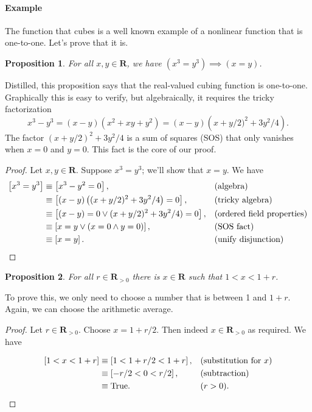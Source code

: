 \documentclass[12pt,fleqn]{article}
\newcommand{\reals}{\mathbf{R}}
\newcommand{\true}{\mathrm{True}}
\newenvironment{myproof}
  {\begin{shaded}\begin{proof}}
  {\end{proof}\end{shaded}}
\newtheorem{prop}{Proposition}
\newcounter{ex}\setcounter{ex}{0}
\newcommand{\ex}{%
\setcounter{ex}{\value{ex}+1}
\paragraph{Example \theex}}
\begin{document}
     \ex The function that cubes is a well known example of a nonlinear 
     function that is one-to-one. Let's prove that it is.

    \begin{prop} For all $x,y \in \reals$, we have $(x^3 = y^3) \implies (x=y)$. 
      \end{prop}
\noindent Distilled, this proposition says that the real-valued cubing function is one-to-one. Graphically this is easy to verify, but algebraically, it
requires the tricky factorization
\begin{equation*}
  x^3 - y^3 = (x-y) (x^2+x y+y^2) =  (x-y) \left(x + y/2)^2 + 3 y^2 /4\right).
\end{equation*}
The factor $\left(x + y/2\right)^2 + 3 y^2 /4$ is a sum of squares (SOS) that only vanishes when $x=0$ and $y=0$.  This fact is the core of
our proof.
\begin{myproof}
Let $x,y \in \reals$. Suppose $x^3 = y^3$; we'll show that $x=y$. We have
\begin{align*}
 \left[x^3 = y^3 \right] &\equiv \left [x^3 - y^2 = 0 \right],   &&(\mbox{algebra}) \\
                                        &\equiv \left [(x-y)  \left((x + y/2)^2 + 3 y^2 /4 \right)  = 0 \right],   &&(\mbox{tricky algebra}) \\
                                        &\equiv \left [(x-y) = 0   \lor  (x + y/2)^2 + 3 y^2 /4)  = 0 \right],   &&(\text{ordered field properties}) \\
                                         &\equiv \left [x = y    \lor  \left(x=0 \land y = 0 \right) \right],   &&(\text{SOS fact}) \\
                                         &\equiv \left[x=y\right].  &&(\text{unify disjunction}) \qedhere
\end{align*}
\end{myproof}
    \begin{prop} For all $r \in \reals_{>0}$ there is $x \in \reals$
      such that $1 < x < 1+r$. 
    \end{prop} 

To prove this, we only need to choose a number that is between 1 and $1+r$. Again, we can choose the arithmetic average.
\begin{myproof} Let $r \in \reals_{>0}$.  Choose $x= 1+r/2$. Then indeed $x \in \reals_{> 0}$ as required. We have

\begin{align*}
  \left[1 < x < 1+r \right] &\equiv \left[1 < 1+r/2 < 1+r \right],   && (\text{substitution for } x )\\
                                          & \equiv \left[-r/2 < 0  < r/2 \right],  && (\text{subtraction})  \\
                                          &\equiv \true.                                      && (r > 0). \qedhere
\end{align*}

\end{myproof}
\end{document}
